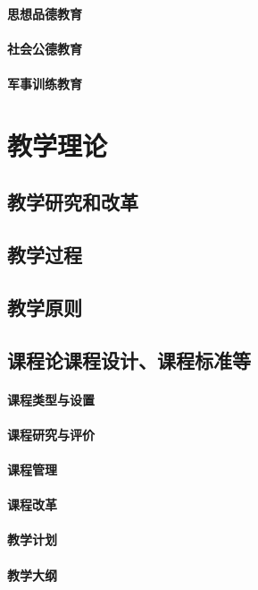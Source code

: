 \documentclass[UTF8]{../../ApplicationUniverse}
\begin{document}
    \subsubsection{思想品德教育}
    \subsubsection{社会公德教育}
    \subsubsection{军事训练教育}



\chapter{教学理论}
\section{教学研究和改革}
\section{教学过程}
\section{教学原则}
\section{课程论课程设计、课程标准等}
    \subsubsection{课程类型与设置}
    \subsubsection{课程研究与评价}
    \subsubsection{课程管理}
    \subsubsection{课程改革}
    \subsubsection{教学计划}
    \subsubsection{教学大纲}
\end{document}
